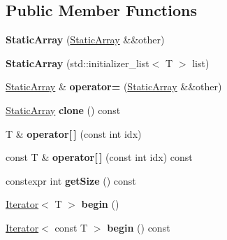 \subsection*{Public Member Functions}
\begin{DoxyCompactItemize}
\item 
\hypertarget{classStaticArray_a7afc6f3dac246b4b3029d675bafa891a}{}\label{classStaticArray_a7afc6f3dac246b4b3029d675bafa891a} 
{\bfseries Static\+Array} (\hyperlink{classStaticArray}{Static\+Array} \&\&other)
\item 
\hypertarget{classStaticArray_abdb198700bd60f1ca555c289e371c3a1}{}\label{classStaticArray_abdb198700bd60f1ca555c289e371c3a1} 
{\bfseries Static\+Array} (std\+::initializer\+\_\+list$<$ T $>$ list)
\item 
\hypertarget{classStaticArray_aa3336d3e804f1e781373b070db4b8933}{}\label{classStaticArray_aa3336d3e804f1e781373b070db4b8933} 
\hyperlink{classStaticArray}{Static\+Array} \& {\bfseries operator=} (\hyperlink{classStaticArray}{Static\+Array} \&\&other)
\item 
\hypertarget{classStaticArray_a1574a69c6f57ae9a57bc52727b973643}{}\label{classStaticArray_a1574a69c6f57ae9a57bc52727b973643} 
\hyperlink{classStaticArray}{Static\+Array} {\bfseries clone} () const
\item 
\hypertarget{classStaticArray_aa0d12fba9d539098180f62eab4c5dceb}{}\label{classStaticArray_aa0d12fba9d539098180f62eab4c5dceb} 
T \& {\bfseries operator\mbox{[}$\,$\mbox{]}} (const int idx)
\item 
\hypertarget{classStaticArray_a002fe3d95904eeb64527bc4e1cc91e17}{}\label{classStaticArray_a002fe3d95904eeb64527bc4e1cc91e17} 
const T \& {\bfseries operator\mbox{[}$\,$\mbox{]}} (const int idx) const
\item 
\hypertarget{classStaticArray_a370e6c931610ab5e4cbbdbf8b0f34cdb}{}\label{classStaticArray_a370e6c931610ab5e4cbbdbf8b0f34cdb} 
constexpr int {\bfseries get\+Size} () const
\item 
\hypertarget{classStaticArray_a8c1c988b8066d74d2067d42d3b0191db}{}\label{classStaticArray_a8c1c988b8066d74d2067d42d3b0191db} 
\hyperlink{classIterator}{Iterator}$<$ T $>$ {\bfseries begin} ()
\item 
\hypertarget{classStaticArray_a79638947269b15047cb1eaba54c117cf}{}\label{classStaticArray_a79638947269b15047cb1eaba54c117cf} 
\hyperlink{classIterator}{Iterator}$<$ const T $>$ {\bfseries begin} () const
\item 
\hypertarget{classStaticArray_a0efbc4b5730477499d7e4f82a604df16}{}\label{classStaticArray_a0efbc4b5730477499d7e4f82a604df16} 

\end{DoxyCompactItemize}
